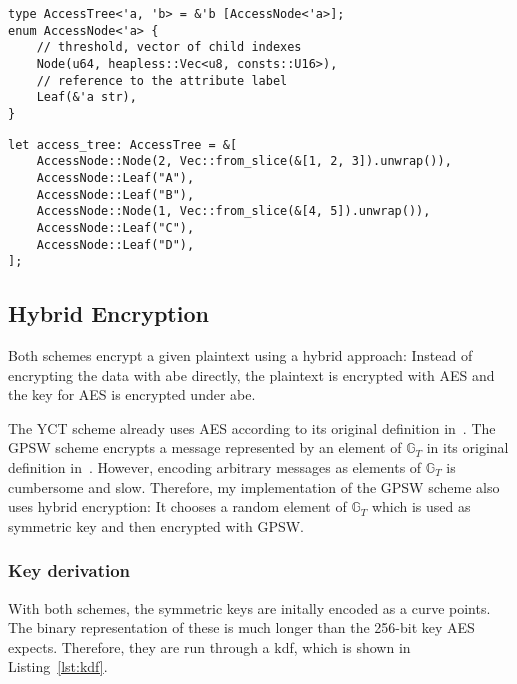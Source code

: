 \begin{lstlisting}[float=h,caption={Refined implementation of \glspl{access-tree} (works without standard library)},label={lst:access-tree-heapless}]
type AccessTree<'a, 'b> = &'b [AccessNode<'a>];
enum AccessNode<'a> {
    // threshold, vector of child indexes
    Node(u64, heapless::Vec<u8, consts::U16>),
    // reference to the attribute label
    Leaf(&'a str),
}
\end{lstlisting}
\begin{lstlisting}[float=h,caption={\Gls{access-tree} from Figure~\ref{fig:sample-access-tree} in the heapless Rust representation},label={lst:access-tree-example}]
let access_tree: AccessTree = &[
    AccessNode::Node(2, Vec::from_slice(&[1, 2, 3]).unwrap()),
    AccessNode::Leaf("A"),
    AccessNode::Leaf("B"),
    AccessNode::Node(1, Vec::from_slice(&[4, 5]).unwrap()),
    AccessNode::Leaf("C"),
    AccessNode::Leaf("D"),
];
\end{lstlisting}

\subsection{Hybrid Encryption}
Both schemes encrypt a given plaintext using a hybrid approach:
Instead of encrypting the data with \acrshort{abe} directly, the plaintext is encrypted with AES and the key for AES is encrypted under \acrshort{abe}.

The YCT scheme already uses AES according to its original definition in~\cite{yao_lightweight_2015}.
The GPSW scheme encrypts a message represented by an element of $\mathbb{G}_T$ in its original definition in~\cite{goyal_attribute-based_2006}.
However, encoding arbitrary messages as elements of $\mathbb{G}_T$ is cumbersome and slow.
Therefore, my implementation of the GPSW scheme also uses hybrid encryption:
It chooses a random element of $\mathbb{G}_T$ which is used as symmetric key and then encrypted with GPSW.%


\subsubsection{Key derivation}\label{sec:kdf}
With both schemes, the symmetric keys are initally encoded as a curve points.
The binary representation of these is much longer than the 256-bit key AES expects.
Therefore, they are run through a \gls{kdf}, which is shown in Listing~\ref{lst:kdf}.

